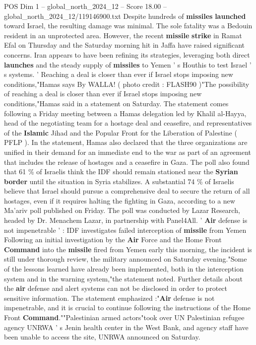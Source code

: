 \begin{textsample}{POS Dim 1 – global\_north\_2024\_12 – Score 18.00 – global\_north\_2024\_12/119146900.txt}
Despite hundreds of \textbf{missiles} \textbf{launched} toward Israel, the resulting damage was minimal.
The sole fatality was a Bedouin resident in an unprotected area.
However, the recent \textbf{missile} \textbf{strike} in Ramat Efal on Thursday and the Saturday morning hit in Jaffa have raised significant concerns.
Iran appears to have been refining its strategies, leveraging both direct \textbf{launches} and the steady supply of \textbf{missiles} to Yemen ' s Houthis to test Israel ' s systems. ' Reaching a deal is closer than ever if Israel stops imposing new conditions,"Hamas says By WALLA! ( photo credit : FLASH90 )"The possibility of reaching a deal is closer than ever if Israel stops imposing new conditions,"Hamas said in a statement on Saturday.
The statement comes following a Friday meeting between a Hamas delegation led by Khalil al-Hayya, head of the negotiating team for a hostage deal and ceasefire, and representatives of the \textbf{Islamic} Jihad and the Popular Front for the Liberation of Palestine ( PFLP ).
In the statement, Hamas also declared that the three organizations are unified in their demand for an immediate end to the war as part of an agreement that includes the release of hostages and a ceasefire in Gaza.
The poll also found that 61 \% of Israelis think the IDF should remain stationed near the \textbf{Syrian} \textbf{border} until the situation in Syria stabilizes.
A substantial 74 \% of Israelis believe that Israel should pursue a comprehensive deal to secure the return of all hostages, even if it requires halting the fighting in Gaza, according to a new Ma'ariv poll published on Friday.
The poll was conducted by Lazar Research, headed by Dr.
Menachem Lazar, in partnership with Panel4All. ' \textbf{Air} defense is not impenetrable ' : IDF investigates failed interception of \textbf{missile} from Yemen Following an initial investigation by the \textbf{Air} Force and the Home Front \textbf{Command} into the \textbf{missile} fired from Yemen early this morning, the incident is still under thorough review, the military announced on Saturday evening."Some of the lessons learned have already been implemented, both in the interception system and in the warning system,"the statement noted.
Further details about the \textbf{air} defense and alert systems can not be disclosed in order to protect sensitive information.
The statement emphasized :"\textbf{Air} defense is not impenetrable, and it is crucial to continue following the instructions of the Home Front \textbf{Command}.""Palestinian armed actors"took over UN Palestinian refugee agency UNRWA ' s Jenin health center in the West Bank, and agency staff have been unable to access the site, UNRWA announced on Saturday.

\end{textsample}
